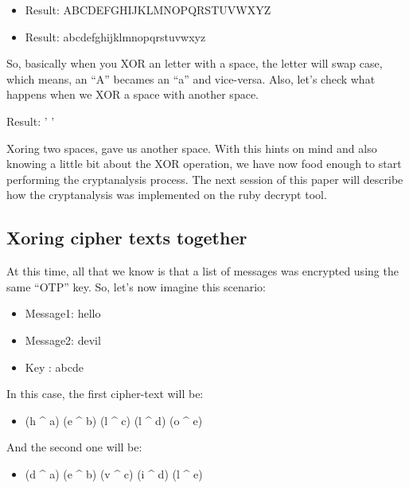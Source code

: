 \documentclass[journal]{IEEEtran}
\begin{document}

\begin{itemize}
	\item Result: ABCDEFGHIJKLMNOPQRSTUVWXYZ
\end{itemize}


\begin{itemize}
	\item Result: abcdefghijklmnopqrstuvwxyz
\end{itemize}

So, basically when you XOR an letter with a space, the letter will swap case, which means, an “A” becames an “a” and vice-versa. Also, let’s check what happens when we XOR a space with another space.


Result: ' '

Xoring two spaces, gave us another space. With this hints on mind and also knowing a little bit about the XOR operation, we have now food enough to start performing the cryptanalysis process. The next session of this paper will describe how the cryptanalysis was implemented on the ruby decrypt tool.


\subsection{Xoring cipher texts together}
At this time, all that we know is that a list of messages was encrypted using the same “OTP” key. So, let’s now imagine this scenario:

\begin{itemize}
	\item Message1: hello
	\item Message2: devil
	\item Key     : abcde
\end{itemize}

In this case, the first cipher-text will be:

\begin{itemize}
	\item (h \textasciicircum{} a) (e \textasciicircum{} b) (l \textasciicircum{} c) (l \textasciicircum{} d) (o \textasciicircum{} e)
\end{itemize}

And the second one will be:

\begin{itemize}
	\item (d \textasciicircum{} a) (e \textasciicircum{} b) (v \textasciicircum{} c) (i \textasciicircum{} d) (l \textasciicircum{} e)
\end{itemize}
\end{document}
